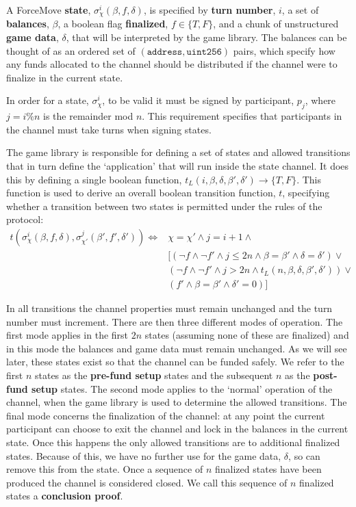 A ForceMove \textbf{state}, $\sigma_\chi^i(\beta, f, \delta)$, is specified by \textbf{turn number}, $i$,
a set of \textbf{balances}, $\beta$, a boolean flag \textbf{finalized}, $f \in \{T, F\}$, and
a chunk of unstructured \textbf{game data}, $\delta$, that will be interpreted by the game library. The
balances can be thought of as an ordered set of $(\texttt{address}, \texttt{uint256})$ pairs,
which specify how any funds allocated to the channel should be distributed if the channel 
were to finalize in the current state.

In order for a state, $\sigma_\chi^i$, to be valid it must be signed by participant, $p_j$,
where $j = i \% n$ is the remainder mod $n$. This requirement specifies that participants
in the channel must take turns when signing states.

The game library is responsible for defining a set of states and allowed transitions that
in turn define the `application' that will run inside the state channel. It does this by
defining a single boolean function, $t_L(i, \beta, \delta, \beta', \delta') \rightarrow \{ T, F\}$.
This function is used to derive an overall boolean transition function, $t$, specifying whether
a transition between two states is permitted under the rules of the protocol:
\begin{align*}
  t(\sigma_\chi^i(\beta, f, \delta), \sigma_{\chi'}^j(\beta', f', \delta') ) \Leftrightarrow &
    \chi = \chi'
    \wedge j = i + 1
    \wedge \\
    & [ (\neg f \wedge \neg f' \wedge j \leq 2n \wedge \beta = \beta' \wedge \delta = \delta') \vee \\
    & (\neg f \wedge \neg f' \wedge j > 2n \wedge t_L(n, \beta, \delta, \beta', \delta')) \vee \\
    & (f' \wedge \beta = \beta' \wedge \delta' = 0) ]
\end{align*}

In all transitions the channel properties must remain unchanged and the turn number must increment.
There are then three different modes of operation. The first mode applies in the first $2n$
states (assuming none of these are finalized) and in this mode the balances and game data
must remain unchanged. As we will see later, these states exist so that the channel can be
funded safely. We refer to the first $n$ states as the \textbf{pre-fund setup} states and
the subsequent $n$ as the \textbf{post-fund setup} states. The second mode applies to the
`normal' operation of the channel, when the game library is used to determine the allowed
transitions. The final mode concerns the finalization of the channel: at any point the current
participant can choose to exit the channel and lock in the balances in the current state.
Once this happens the only allowed transitions are to additional finalized states. Because
of this, we have no further use for the game data, $\delta$, so can remove this from the state.
Once a sequence of $n$ finalized states have been produced the channel is considered closed. We
call this sequence of $n$ finalized states a \textbf{conclusion proof}.

